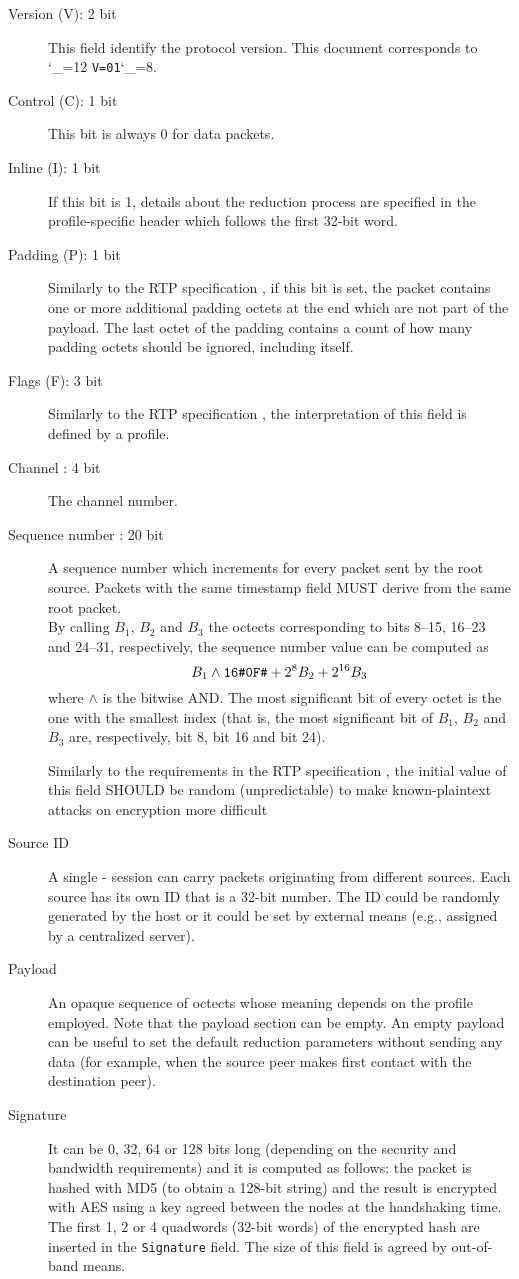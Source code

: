 \documentclass{rfc}
\def\ttt{\catcode`\_=12 \tttii}
\def\tttii#1!{{\tt #1}\catcode`\_=8{}}
\begin{document}
\begin{description}
\label{description:4.0.0;transport_layer}
\item[Version (V): 2 bit]
This field identify the protocol version.  This document
corresponds to \ttt V=01!.
\item[Control (C): 1 bit] This bit is always 0 for data packets.
\item[Inline  (I): 1 bit]
If this bit is 1, details about the reduction process are specified in
the profile-specific header which follows the first 32-bit word.  
\item[Padding (P): 1 bit] Similarly to the RTP specification
\cite{rfc3550}, if this bit is set, the packet contains one or more
additional padding octets at the end which are not part of the
payload.  The last octet of the padding contains a count of how many
padding octets should be ignored, including itself.
\item[Flags (F): 3 bit] Similarly to the RTP
specification \cite{rfc3550}, the interpretation of this field is defined by a
profile.
\item[Channel : 4 bit] The channel number.
\item[Sequence number : 20 bit] A sequence number which increments for every
  packet sent by the root source. Packets with the same timestamp
  field MUST derive from the same root packet.\\
  By calling $B_1$, $B_2$ and $B_3$ the octects corresponding to bits
  8--15, 16--23 and 24--31, respectively, the sequence number value
  can be computed as
$$
   B_1 \wedge \text{\tt 16\#0F\#} + 
   2^8 B_2 + 2^{16} B_3
$$ 
%
where $\wedge$ is the bitwise AND.  The most significant bit of every
octet is the one with the smallest index (that is, the most
significant bit of $B_1$, $B_2$ and $B_3$ are, respectively, bit 8,
bit 16 and bit 24).

Similarly to the requirements in the RTP specification \cite{rfc3550},
the initial value of this field SHOULD be random (unpredictable) to
make known-plaintext attacks on encryption more difficult
\item[Source ID] A single \ppetp- session can carry packets
  originating from different sources.  Each source has its own ID that
  is a 32-bit number.  The ID could be randomly generated by the host
  or it could be set by external means (e.g., assigned by a
  centralized server).
\item[Payload] An opaque sequence of octects whose meaning depends on
  the profile employed.  Note that the payload section can be empty.
  An empty payload can be useful to set the default reduction
  parameters without sending any data (for example, when the source
  peer makes first contact with the destination peer).
%
\item[Signature] It can be 0, 32, 64 or 128 bits long (depending on
the security and bandwidth requirements) and it is computed as
follows: the packet is hashed with MD5 (to obtain a 128-bit string)
and the result is encrypted with AES using a key agreed between the
nodes at the handshaking time.  The first 1, 2 or 4 quadwords (32-bit
words) of the encrypted hash are inserted in the \texttt{Signature}
field.  The size of this field is agreed by out-of-band means.
\end{description}
\end{document}

